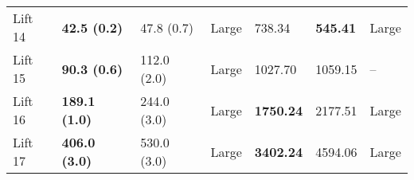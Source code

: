 \begin{tabular}{lllllll}
Lift 14 &  \textbf{42.5 (0.2)} &            47.8 (0.7) &       Large &                  738.34 &          \textbf{545.41} &       Large \\
Lift 15 &  \textbf{90.3 (0.6)} &           112.0 (2.0) &       Large &                 1027.70 &                  1059.15 &          -- \\
Lift 16 & \textbf{189.1 (1.0)} &           244.0 (3.0) &       Large &        \textbf{1750.24} &                  2177.51 &       Large \\
Lift 17 & \textbf{406.0 (3.0)} &           530.0 (3.0) &       Large &        \textbf{3402.24} &                  4594.06 &       Large \\
\bottomrule
\end{tabular}
